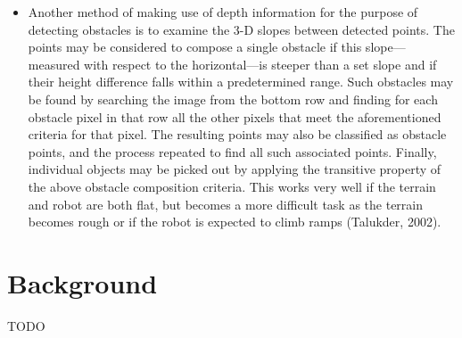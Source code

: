 \documentclass[12pt]{report}
\begin{document}
\begin{itemize}
\item{Another method of making use of depth information for the purpose of detecting obstacles is to examine the 3-D slopes between detected points.  The points may be considered to compose a single obstacle if this slope---measured with respect to the horizontal---is steeper than a set slope and if their height difference falls within a predetermined range.  Such obstacles may be found by searching the image from the bottom row and finding for each obstacle pixel in that row all the other pixels that meet the aforementioned criteria for that pixel.  The resulting points may also be classified as obstacle points, and the process repeated to find all such associated points.  Finally, individual objects may be picked out by applying the transitive property of the above obstacle composition criteria.  This works very well if the terrain and robot are both flat, but becomes a more difficult task as the terrain becomes rough or if the robot is expected to climb ramps (Talukder, 2002).}
\end{itemize}

\section{Background}
TODO
\end{document}
